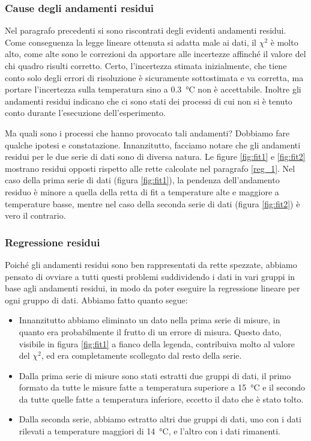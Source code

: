 \subsubsection{Cause degli andamenti residui}

Nel paragrafo precedenti si sono riscontrati degli evidenti andamenti residui. Come conseguenza la legge lineare ottenuta
si adatta male ai dati, il $\chi^2$ è molto alto, come alte sono le correzioni da apportare alle incertezze affinché 
il valore del chi quadro risulti corretto. Certo, l'incertezza stimata inizialmente, che tiene conto solo degli errori di risoluzione
è sicuramente sottostimata e va corretta, ma portare l'incertezza sulla temperatura sino a \SI{0.3}{\celsius} non è accettabile.
Inoltre gli andamenti residui indicano che ci sono stati dei processi di cui non si è tenuto conto durante l'esecuzione dell'esperimento.

Ma quali sono i processi che hanno provocato tali andamenti? Dobbiamo fare qualche ipotesi e constatazione. Innanzitutto,
facciamo notare che gli andamenti
residui per le due serie di dati sono di diversa natura. Le figure \ref{fig:fit1} e \ref{fig:fit2} mostrano residui opposti rispetto
alle rette calcolate nel paragrafo \ref{reg_1}.
Nel caso della prima serie di dati (figura \ref{fig:fit1}), la pendenza dell'andamento
residuo è minore a quella della retta di fit a temperature alte e maggiore a temperature basse, mentre nel caso della seconda serie di
dati (figura \ref{fig:fit2}) è vero il contrario.

\subsubsection{Regressione residui}

Poiché gli andamenti residui sono ben rappresentati da rette spezzate, abbiamo pensato di ovviare a tutti questi problemi suddividendo i
dati in vari gruppi in base agli andamenti residui, in modo da poter eseguire la regressione lineare per ogni gruppo di dati.
Abbiamo fatto quanto segue:

\label{sottoserie}
\begin{itemize}
    \item{Innanzitutto abbiamo eliminato un dato nella prima serie di misure, in quanto era probabilmente il frutto di un
        errore di misura. Questo dato, visibile in figura \ref{fig:fit1} a fianco della legenda,
        contribuiva molto al valore del $\chi^2$, ed era completamente scollegato dal resto della serie.}
    \item{Dalla prima serie di misure sono stati estratti due gruppi di dati, il primo formato da tutte le misure fatte
        a temperatura superiore a \SI{15}{\celsius} e il secondo da tutte quelle fatte a temperatura inferiore, eccetto
        il dato che è stato tolto.}
    \item{Dalla seconda serie, abbiamo estratto altri due gruppi di dati, uno con i dati rilevati a temperature maggiori di
        \SI{14}{\celsius}, e l'altro con i dati rimanenti.}
\end{itemize}

